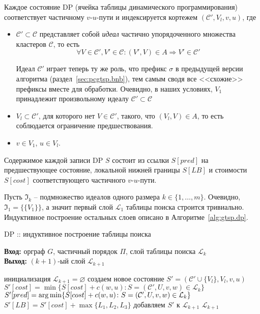 Каждое состояние DP
(ячейка таблицы динамического программирования)
соответствует частичному $v$-$u$-пути и индексируется кортежем
$(\mathcal C',V_l,v, u)$,
где
\begin{itemize}
  \item
  $\mathcal C'\subset \mathcal C$ представляет собой \textit{идеал}
  частично упорядоченного множества кластеров $\mathcal C$, то есть
  \[
    \forall V\in\mathcal C', V'\in\mathcal C \colon   (V',V)\in A \Rightarrow V'\in\mathcal C'
  \]

  Идеал $\mathcal C'$
  играет теперь ту же роль,
  что префикс $\sigma$
  в предыдущей версии алгоритма (раздел~\ref{sec:pcgtsp.bnb}),
  тем самым сводя все <<схожие>>
  префиксы вместе для обработки.
  Очевидно,
  в наших условиях,
  $V_1$
  принадлежит произвольному идеалу
  $\mathcal C'\subset\mathcal C$
  \item
  $V_l\subset\mathcal C'$,
  для которого нет
  $V\in \mathcal C'$,
  такого, что
  $(V_l,V)\in A$,
  то есть соблюдается ограничение предшествования.
  \item
  $v\in V_1$, $u\in V_l$.
\end{itemize}

Содержимое каждой записи DP
$S$
состоит из ссылки
$S[pred]$
на предшествующее состояние,
локальной нижней границы
$S[LB]$
и стоимости
$S[cost]$
соответствующего частичного
$v$-$u$-пути.

Пусть $\mathfrak I_k$
-- подмножество идеалов одного размера
$k\in\{1,\ldots,m\}$.
Очевидно,
$\mathfrak I_1=\{\{V_1\}\}$,
а значит первый слой
$\mathcal L_1$
таблицы поиска строится тривиально.
Индуктивное построение остальных слоев
описано в Алгоритме~\ref{alg:gtsp.dp}.

\begin{algorithm}[t]
  \caption{DP ::  индуктивное построение таблицы поиска}\label{alg:gtsp.dp}
  \textbf{Вход:} орграф $G$, частичный порядок $\Pi$, слой таблицы поиска $\mathcal L_k$\\
  \textbf{Выход:} $(k+1)$-ый слой $\mathcal L_{k+1}$
  \begin{algorithmic}[1]
  \STATE инициализация $\mathcal L_{k+1}=\varnothing$
        \STATE создаем новое состояние $S'=(\mathcal C'\cup\{V_l\}, V_l, v, u)$
        \STATE $S'[cost] = \min\{S[cost] + c(w,u)\colon S=(\mathcal C',U,v,w)\in\mathcal L_k\}$
        \STATE $S'[pred] = \operatorname*{arg\,min}\{S[cost] + c(w,u)\colon S=(\mathcal C',U,v,w)\in\mathcal L_k\}$
        \STATE $S'[LB] = S'[cost] + \max\{L_1,L_2,L_3\}$ \label{alg:pcgtsp.dp.LBs}
         \label{alg:pcgtsp.dp.cut}
          \STATE добавляем $S'$ к $\mathcal L_{k+1}$
        \ENDIF
      \ENDIF
      \ENDFOR
    \ENDFOR
  \ENDFOR
  \RETURN $\mathcal L_{k+1}$
  \end{algorithmic}
\end{algorithm}

